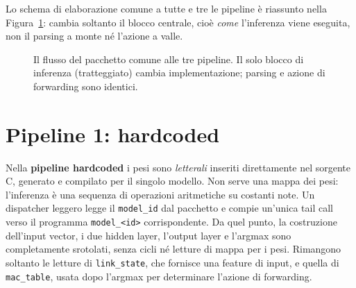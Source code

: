 \documentclass[binding=0.6cm,italian,oneside,noexaminfo]{sapthesis}
\begin{document}
Lo schema di elaborazione comune a tutte e tre le pipeline è riassunto nella Figura~\ref{fig:common}: cambia soltanto il blocco centrale, cioè \emph{come} l'inferenza viene eseguita, non il parsing a monte né l'azione a valle.

\begin{figure}[h]
\centering
{}
\caption{Il flusso del pacchetto comune alle tre pipeline. Il solo blocco di inferenza (tratteggiato) cambia implementazione; parsing e azione di forwarding sono identici.}
\label{fig:common}
\end{figure}

\section{Pipeline 1: hardcoded}
\label{sec:p1}

Nella \textbf{pipeline hardcoded} i pesi sono \emph{letterali} inseriti direttamente nel sorgente C, generato e compilato per il singolo modello. Non serve una mappa dei pesi: l'inferenza è una sequenza di operazioni aritmetiche su costanti note. Un dispatcher leggero legge il \texttt{model\_id} dal pacchetto e compie un'unica tail call verso il programma \texttt{model\_<id>} corrispondente. Da quel punto, la costruzione dell'input vector, i due hidden layer, l'output layer e l'argmax sono completamente srotolati, senza cicli né letture di mappa per i pesi. Rimangono soltanto le letture di \texttt{link\_state}, che fornisce una feature di input, e quella di \texttt{mac\_table}, usata dopo l'argmax per determinare l'azione di forwarding.
\end{document}
